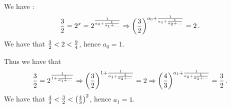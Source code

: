 
 

\baselineskip=14pt
\def\vare {\varepsilon}
\def\t {\tilde}
\def\a {\alpha}
\def\K {{\bf K}}
\def\N {{\bf N}}
\def\C {{\cal C}}
\def\L {{\cal L}}
\def\E {{\cal E}}
\def\s {{\sigma}}
\def\S {{\Sigma}}
\def\p{\partial}
\def\vare{{\varepsilon}}
\def\Q {{\bf Q}}
\def\D {{\cal D}}
\def\G {{\Gamma}}
\def\Z {{\bf Z}}
\def\R  {{\bf R}}
\def\l {\lambda}
\def\ll {{\bf l}}
\def\degree {{\bf {\rm degree}\,\,}}
\def \finish {${\,\,\vrule height1mm depth2mm width 8pt}$}
\def \m {\medskip}
\def\p {\partial}
\def\r {{\bf r}}
\def\pt {{\bf p}}
\def\v {{\bf v}}
\def\n {{\bf n}}
\def\t {{\bf t}}
\def\b {{\bf b}}
\def\c {{\bf c }}
\def\e{{\bf e}}
\def\f{{\bf f}}
\def\ac {{\bf a}}
\def \X   {{\bf X}}
\def \Y   {{\bf Y}}
\def \x   {{\bf x}}
\def \y   {{\bf y}}
\def\w {{\omega}}
\def \Tr  {{\rm Tr\,}}
\def\dim {{\rm dim\,\,}}
\def\t {{\tilde}} 
\def\dist {{\hbox{\tt "distance"}}}

We have :
    $$
{3\over 2}=2^x=2^{1\over a_0+{1\over a_1+\dots}}
 \Rightarrow
\left({3\over 2}\right)^{a_0+{1\over a_1+{1\over a_2+\dots}}}=2\,.
    $$
We have that ${3\over 2}<2<{9\over 4}$, hence $a_0=1$.

Thus we have that
     $$
{3\over 2}=  2^{1\over 1+{1\over a_1+\dots}}\Rightarrow
\left({3\over 2}\right)^{1+{1\over a_1+{1\over a_2+\dots}}}=2
\Rightarrow 
\left({4\over 3}\right)^{a_1+{1\over a_2+{1\over a_3+\dots}}}=
{3\over 2}\,.
$$
We have that ${4\over 3}<{3\over 2}<\left({4\over 3}\right)^2$, 
hence $a_1=1$.

\bye
